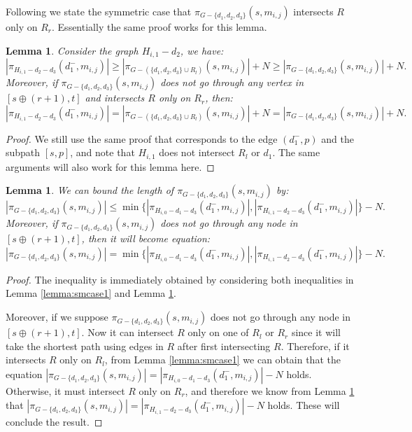 \documentclass[11pt]{article}
\theoremstyle{plain}
\newtheorem{lemma}[theorem]{Lemma}
\theoremstyle{definition}
\newcommand{\set}[1]{\{ #1 \}}
\newcommand{\og}[3]{\pi_{G-#3}\left(#1,#2\right)}
\begin{document}
Following we state the symmetric case that $\og{s}{m_{i,j}}{\set{d_1, d_2, d_3}}$ intersects $R$ only on $R_r$. Essentially the same proof works for this lemma.

\begin{lemma}\label{lemma:smcase2}
    Consider the graph $H_{i,1}-d_2$, we have:
    \[|\pi_{H_{i,1}-d_2-d_3}(d_1^-,m_{i,j})| \geq |\og{s}{m_{i,j}}{(\set{d_1, d_2, d_3} \cup R_l)}| + N \geq |\og{s}{m_{i,j}}{\set{d_1, d_2, d_3}}| + N.\]
    Moreover, if $\og{s}{m_{i,j}}{\set{d_1, d_2, d_3}}$ {does not go through any vertex in $[s \oplus (r+1),t]$ and} intersects $R$ only on $R_r$, then:
    \[|\pi_{H_{i,1}-d_2-d_3}(d_1^-,m_{i,j})| = |\og{s}{m_{i,j}}{(\set{d_1, d_2, d_3} \cup R_l)}| + N = |\og{s}{m_{i,j}}{\set{d_1, d_2, d_3}}| + N.\]
\end{lemma}

\begin{proof}
    We still use the same proof that corresponds to the edge $(d_1^-,p)$ and the subpath $[s,p]$, and note that $H_{i,1}$ does not intersect $R_l$ or $d_1$. The same arguments will also work for this lemma here.
\end{proof}

\begin{lemma}\label{lemma:sm}
    We can bound the length of $\og{s}{m_{i,j}}{\set{d_1, d_2, d_3}}$ by:
    \[|\og{s}{m_{i,j}}{\set{d_1, d_2, d_3}}| \leq \min \{ |\pi_{H_{i,0}-d_1-d_3}(d_1^-,m_{i,j})|,|\pi_{H_{i,1}-d_2-d_3}(d_1^-,m_{i,j})| \}-N.\]
    Moreover, if $\og{s}{m_{i,j}}{\set{d_1, d_2, d_3}}$ does not go through any node in $[s \oplus (r+1),t]$, then it will become equation:
    \[|\og{s}{m_{i,j}}{\set{d_1, d_2, d_3}}| = \min \{ |\pi_{H_{i,0}-d_1-d_3}(d_1^-,m_{i,j})|,|\pi_{H_{i,1}-d_2-d_3}(d_1^-,m_{i,j})| \} - N.\]
\end{lemma}

\begin{proof}
    The inequality is immediately obtained by considering both inequalities in Lemma \ref{lemma:smcase1} and Lemma \ref{lemma:smcase2}.
    
    Moreover, if we suppose $\og{s}{m_{i,j}}{\set{d_1, d_2, d_3}}$ does not go through any node in $[s \oplus (r+1),t]$. Now it can intersect $R$ only on one of $R_l$ or $R_r$ since it will take the shortest path using edges in $R$ after first intersecting $R$. Therefore, if it intersects $R$ only on $R_l$, from Lemma \ref{lemma:smcase1} we can obtain that the equation $|\og{s}{m_{i,j}}{\set{d_1, d_2, d_3}}| = |\pi_{H_{i,0}-d_1-d_3}(d_1^-,m_{i,j})|-N$ holds. Otherwise, it must intersect $R$ only on $R_r$, and therefore we know from Lemma \ref{lemma:smcase2} that $|\og{s}{m_{i,j}}{\set{d_1, d_2, d_3}}| = |\pi_{H_{i,1}-d_2-d_3}(d_1^-,m_{i,j})|-N$ holds. These will conclude the result.
\end{proof}
\end{document}
